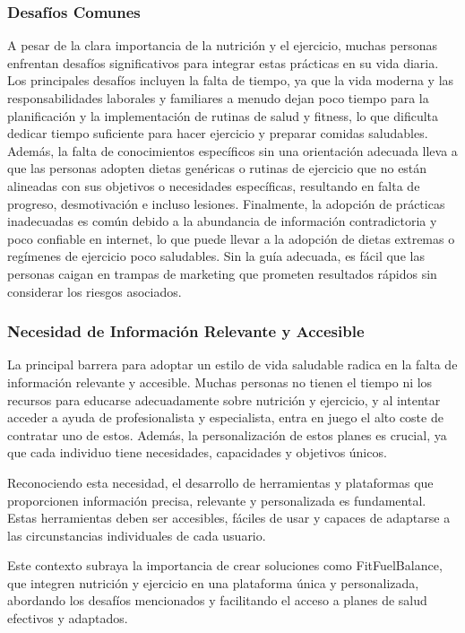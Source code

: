\subsubsection{Desafíos Comunes}
A pesar de la clara importancia de la nutrición y el ejercicio, muchas personas enfrentan desafíos significativos para integrar estas prácticas en su vida diaria. Los principales desafíos incluyen la falta de tiempo, ya que la vida moderna y las responsabilidades laborales y familiares a menudo dejan poco tiempo para la planificación y la implementación de rutinas de salud y fitness, lo que dificulta dedicar tiempo suficiente para hacer ejercicio y preparar comidas saludables. Además, la falta de conocimientos específicos sin una orientación adecuada lleva a que las personas adopten dietas genéricas o rutinas de ejercicio que no están alineadas con sus objetivos o necesidades específicas, resultando en falta de progreso, desmotivación e incluso lesiones. Finalmente, la adopción de prácticas inadecuadas es común debido a la abundancia de información contradictoria y poco confiable en internet, lo que puede llevar a la adopción de dietas extremas o regímenes de ejercicio poco saludables. Sin la guía adecuada, es fácil que las personas caigan en trampas de marketing que prometen resultados rápidos sin considerar los riesgos asociados.

\subsubsection{Necesidad de Información Relevante y Accesible}
La principal barrera para adoptar un estilo de vida saludable radica en la falta de información relevante y accesible. Muchas personas no tienen el tiempo ni los recursos para educarse adecuadamente sobre nutrición y ejercicio, y al intentar acceder a ayuda de profesionalista y especialista, entra en juego el alto coste de contratar uno de estos. Además, la personalización de estos planes es crucial, ya que cada individuo tiene necesidades, capacidades y objetivos únicos.

Reconociendo esta necesidad, el desarrollo de herramientas y plataformas que proporcionen información precisa, relevante y personalizada es fundamental. Estas herramientas deben ser accesibles, fáciles de usar y capaces de adaptarse a las circunstancias individuales de cada usuario.

Este contexto subraya la importancia de crear soluciones como FitFuelBalance, que integren nutrición y ejercicio en una plataforma única y personalizada, abordando los desafíos mencionados y facilitando el acceso a planes de salud efectivos y adaptados.